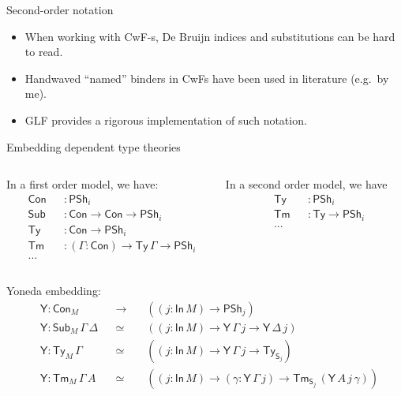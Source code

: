 \documentclass[dvipsnames,aspectratio=169]{beamer}
\newcommand{\Con}{\mathsf{Con}}
\newcommand{\Sub}{\mathsf{Sub}}
\newcommand{\Tm}{\mathsf{Tm}}
\newcommand{\Ty}{\mathsf{Ty}}
\newcommand{\Y}{\mathsf{Y}}
\newcommand{\In}{\mathsf{In}}
\newcommand{\PSh}{\mathsf{PSh}}
\renewcommand{\S}{\mathsf{S}}
\begin{document}
\begin{frame}{Second-order notation}
  \begin{itemize}
  \item When working with CwF-s, De Bruijn indices and substitutions
        can be hard to read.
  \item Handwaved ``named'' binders in CwFs have been used in literature (e.g.\ by me).
  \item GLF provides a rigorous implementation of such notation.
  \end{itemize}
\end{frame}

\begin{frame}{Embedding dependent type theories}

\begin{columns}
\begin{column}{0.5\textwidth}
In a first order model, we have:
\begin{alignat*}{3}
  &\Con &&: \PSh_i \\
  &\Sub &&: \Con \to \Con \to \PSh_i \\
  &\Ty  &&: \Con \to \PSh_i \\
  &\Tm  &&: (\Gamma : \Con) \to \Ty\,\Gamma \to \PSh_i \\
  & ... &&
\end{alignat*}
\end{column}
\begin{column}{0.5\textwidth}
In a second order model, we have
\begin{alignat*}{3}
  &\Ty  &&: \PSh_i \\
  &\Tm  &&: \Ty \to \PSh_i \\
  & ... && \\
  & && \\
  & &&
\end{alignat*}
\end{column}
\end{columns}
\vspace{0.5em}
\pause
Yoneda embedding:
\begin{alignat*}{4}
  & \Y : \Con_M &&\to\,&&((j : \In\,M) \to \PSh_j) \\
  & \Y : \Sub_M\,\Gamma\,\Delta &&\simeq &&((j : \In\,M) \to \Y\,\Gamma\,j \to \Y\,\Delta\,j) \\
  & \Y : \Ty_M\,\Gamma &&\simeq &&((j : \In\,M) \to \Y\,\Gamma\,j \to \Ty_{\S_j})\\
  & \Y : \Tm_M\,\Gamma\,A &&\simeq &&((j : \In\,M) \to (\gamma : \Y\,\Gamma\,j) \to \Tm_{\S_j}\,(\Y\,A\,j\,\gamma))
\end{alignat*}

\end{frame}
\end{document}
